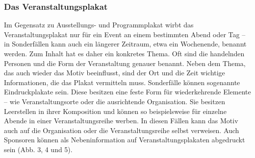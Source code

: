 \documentclass[a4paper,12pt,ngerman]{article}
\begin{document}
\subsubsection{Das Veranstaltungsplakat}
Im Gegensatz zu Ausstellungs- und Programmplakat wirbt das Veranstaltungsplakat nur für ein Event an einem bestimmten Abend oder Tag -- in Sonderfällen kann auch ein längerer Zeitraum, etwa ein Wochenende, benannt werden. Zum Inhalt hat es daher ein konkretes Thema. Oft sind die handelnden Personen und die Form der Veranstaltung genauer benannt. Neben dem Thema, das auch wieder das Motiv beeinflusst, sind der Ort und die Zeit wichtige Informationen, die das Plakat vermitteln muss. Sonderfälle können sogenannte Eindruckplakate sein. Diese besitzen eine feste Form für wiederkehrende Elemente -- wie Veranstaltungsorte oder die ausrichtende Organisation. Sie besitzen Leerstellen in ihrer Komposition und können so beispielsweise für einzelne Abende in einer Veranstaltungsreihe werben. In diesen Fällen kann das Motiv auch auf die Organisation oder die Veranstaltungsreihe selbst verweisen. Auch Sponsoren können als Nebeninformation auf Veranstaltungsplakaten abgedruckt sein (Abb. 3, 4 und 5). \\
\end{document}
